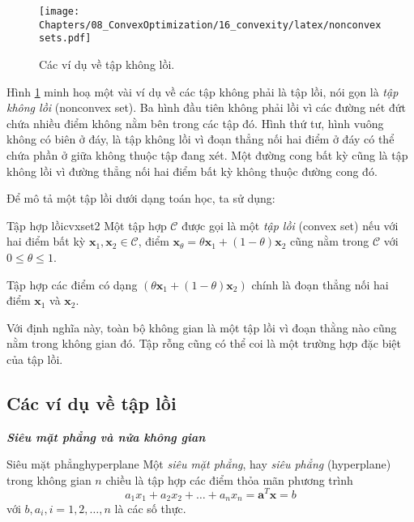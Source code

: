 
\begin{figure}[t]
\centering
\texttt{[image: Chapters/08\_ConvexOptimization/16\_convexity/latex/nonconvexsets.pdf]}
\caption[]{Các ví dụ về tập không lồi.}
\label{fig:16_nonconvexsets}
\end{figure}

Hình \ref{fig:16_nonconvexsets} minh hoạ một vài ví dụ về các tập không phải là
tập lồi, nói gọn là \textit{tập không lồi} ({nonconvex set}). Ba hình đầu
tiên không phải lồi vì các đường nét đứt chứa nhiều điểm không nằm bên trong các
tập đó. Hình thứ tư, hình vuông không có biên ở đáy, là tập không lồi vì đoạn thẳng nối hai điểm ở đáy có thể chứa phần ở giữa không
thuộc tập đang xét. Một đường cong
bất kỳ cũng là tập không lồi vì đường thẳng nối hai điểm
bất kỳ không thuộc đường cong đó.

Để mô tả một {tập lồi} dưới dạng toán học, ta sử dụng:

\begin{mydef}{Tập hợp lồi}{cvxset2}
Một tập hợp $\mathcal{C}$ được gọi là một {\textit{tập lồi}} (convex set) nếu với hai điểm bất
kỳ $\mathbf{x}_1, \mathbf{x}_2 \in \mathcal{C}$, điểm $ \mathbf{x}_{\theta} =
\theta \mathbf{x}_1 + (1 - \theta) \mathbf{x}_2$ cũng nằm trong $\mathcal{C}$
với $0 \leq \theta \leq 1$.
\end{mydef}

Tập hợp các điểm có dạng $\left(\theta \mathbf{x}_1 + (1 -
\theta) \mathbf{x}_2\right)$ chính là {đoạn thẳng} nối hai điểm
$\mathbf{x}_1$ và $\mathbf{x}_2$.

Với định nghĩa này, {toàn bộ không gian} là một {tập lồi}
vì đoạn thằng nào cũng nằm trong không gian đó. Tập rỗng cũng có thể coi là một
trường hợp đặc biệt của {tập lồi}.

\subsection{Các ví dụ về tập lồi}

\textit{\textbf{{Siêu mặt phẳng} và {nửa không gian}}}
\begin{mydef}{Siêu mặt phẳng}{hyperplane}
Một \textit{siêu mặt phẳng}, hay \textit{siêu phẳng} ({hyperplane}) trong
không gian $n$ chiều là tập hợp các điểm thỏa mãn phương trình
\begin{equation}
a_1 x_1 + a_2 x_2 + \dots + a_n x_n = \mathbf{a}^T\mathbf{x} = b
\end{equation}
với $b, a_i, i = 1, 2, \dots, n$ là các số thực.
\end{mydef}

